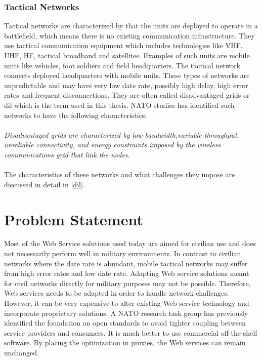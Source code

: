 \documentclass[USenglish]{ifimaster}
\begin{document}
\subsubsection{Tactical Networks}
Tactical networks are characterized by that the units are deployed to operate in
a battlefield, which means there is no existing communication infrastructure.
They use tactical communication equipment which includes technologies like VHF,
UHF, HF, tactical broadband and satellites\cite{IST-090}. %
Examples of such units are mobile units like vehicles, foot soldiers and field
headquarters. The tactical network connects deployed headquarters with mobile
units. These types of networks are unpredictable and may have very low date
rate, possibly high delay, high error rates and frequent disconnections. They
are often called disadvantaged grids or \gls{dil} which is the term used in this
thesis. NATO studies has identified such networks to have the following
characteristics:
\\\\
\textit{
Disadvantaged grids are characterized by low bandwidth,variable throughput,
unreliable connectivity, and energy constraints imposed by the wireless
communications grid that link the nodes}\cite{nato-disadvantaged-grids}.
\paragraph{}
The characteristics of these networks and what challenges they impose are
discussed in detail in \cref{dil}.

\section{Problem Statement}
Most of the Web Service solutions used today are aimed for civilian use and does
not necessarily perform well in military environments. In contrast to civilian
networks where the date rate is abundant, mobile tactical networks may suffer
from high error rates and low date rate. Adapting Web service solutions meant
for civil networks directly for military purposes may not be possible.
Therefore, Web services needs to be adapted in order to handle network
challenges. However, it can be very expensive to alter existing Web service
technology and incorporate proprietary solutions. A NATO research task group has
previously identified the foundation on open standards to avoid tighter coupling
between service providers and consumers\cite{IST-090}. It is much better to use
commercial off-the-shelf software. By placing the optimization in proxies, the
Web services can remain unchanged.
\end{document}

